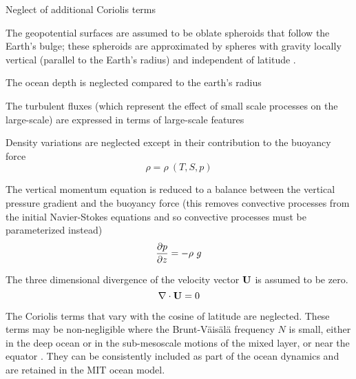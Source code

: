 \documentclass[../main/NEMO_manual]{subfiles}
\begin{document}
\begin{labeling}{Neglect of additional Coriolis terms}
\item [\textit{Spherical Earth approximation}] The geopotential surfaces are assumed to
  be oblate spheroids that follow the Earth's bulge;
  these spheroids are approximated by spheres with gravity locally vertical
  (parallel to the Earth's radius) and independent of latitude
  \citep[][section 2]{white.hoskins.ea_QJRMS05}.
\item [\textit{Thin-shell approximation}] The ocean depth is neglected compared to the earth's radius
\item [\textit{Turbulent closure hypothesis}] The turbulent fluxes
  (which represent the effect of small scale processes on the large-scale)
  are expressed in terms of large-scale features
\item [\textit{Boussinesq hypothesis}] Density variations are neglected except in
  their contribution to the buoyancy force
  \begin{equation}
    \label{eq:MB_PE_eos}
    \rho = \rho \ (T,S,p)
  \end{equation}
\item [\textit{Hydrostatic hypothesis}] The vertical momentum equation is reduced to
  a balance between the vertical pressure gradient and the buoyancy force
  (this removes convective processes from the initial Navier-Stokes equations and so
  convective processes must be parameterized instead)
  \begin{equation}
    \label{eq:MB_PE_hydrostatic}
    \pd[p]{z} = - \rho \ g
  \end{equation}
\item [\textit{Incompressibility hypothesis}] The three dimensional divergence of
  the velocity vector $\mathbf{U}$ is assumed to be zero.
  \begin{equation}
    \label{eq:MB_PE_continuity}
    \nabla \cdot \vect U = 0
  \end{equation}
\item [\textit{Neglect of additional Coriolis terms}] The Coriolis terms that vary with
  the cosine of latitude are neglected.
  These terms may be non-negligible where the Brunt-V\"{a}is\"{a}l\"{a} frequency $N$ is small,
  either in the deep ocean or in the sub-mesoscale motions of the mixed layer,
  or near the equator \citep[][section 1]{white.hoskins.ea_QJRMS05}.
  They can be consistently included as part of the ocean dynamics
  \citep[][section 3(d)]{white.hoskins.ea_QJRMS05} and are retained in the MIT ocean model.
\end{labeling}
\end{document}
